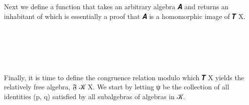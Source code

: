 \documentclass[a4paper,UKenglish,cleveref,autoref,thm-restate]{lipics-v2021}
\begin{document}
Next we define a function  that takes an arbitrary algebra \ab 𝑨 and returns an inhabitant of  which is essentially a proof that \ab 𝑨 is a homomorphic image of \af 𝑻 \ab X.
\ccpad
\begin{code}%
\>[1]\AgdaSpace{}%
\AgdaSymbol{:}\AgdaSpace{}%
\AgdaSymbol{\{}\AgdaSpace{}%
\AgdaSymbol{:}\AgdaSpace{}%
\AgdaSpace{}%
\AgdaSymbol{(}\AgdaSpace{}%
\AgdaSpace{}%
\AgdaSymbol{)}\AgdaSpace{}%
\AgdaSymbol{(}\AgdaSpace{}%
\AgdaSymbol{)\}(}\AgdaSpace{}%
\AgdaSymbol{:}\AgdaSpace{}%
\AgdaSpace{}%
\AgdaSpace{}%
\AgdaSymbol{)}\AgdaSpace{}%
\AgdaSpace{}%
\AgdaSpace{}%
\AgdaSpace{}%
\AgdaSpace{}%
\AgdaSpace{}%
\AgdaSpace{}%
\<%
\\
%
\>[1]\AgdaSpace{}%
\AgdaSpace{}%
\AgdaSpace{}%
\AgdaSymbol{=}\AgdaSpace{}%
\AgdaSymbol{(}\AgdaSpace{}%
\AgdaOperator{\AgdaInductiveConstructor{,}}\AgdaSpace{}%
\AgdaSpace{}%
\AgdaSpace{}%
\AgdaOperator{\AgdaInductiveConstructor{,}}\AgdaSpace{}%
\AgdaSpace{}%
\AgdaOperator{\AgdaInductiveConstructor{,}}\AgdaSpace{}%
\AgdaSpace{}%
\AgdaSymbol{)}\<%
\\
\>[1][@{}l@{\AgdaIndent{0}}]%
\>[2]\<%
\\
\>[2][@{}l@{\AgdaIndent{0}}]%
\>[3]\AgdaSpace{}%
\AgdaSymbol{:}\AgdaSpace{}%
\AgdaSpace{}%
\AgdaSpace{}%
\AgdaSpace{}%
\AgdaSymbol{(}\AgdaSpace{}%
\AgdaSymbol{(}\AgdaSpace{}%
\AgdaSymbol{)}\AgdaSpace{}%
\AgdaSymbol{)}\AgdaFunction{,}\AgdaSpace{}%
\AgdaSpace{}%
\AgdaSpace{}%
\AgdaSpace{}%
\<%
\\
%
\>[3]\AgdaSpace{}%
\AgdaSymbol{=}\AgdaSpace{}%
\AgdaSpace{}%
\<%
\end{code}
\ccpad
Finally, it is time to define the congruence relation modulo which \af 𝑻 \ab X yields the relatively free algebra, \af 𝔉 \ab 𝒦 \ab X. We start by letting \af ψ be the collection of all identities (\ab p, \ab q) satisfied by all subalgebras of algebras in \ab 𝒦.
\end{document}
